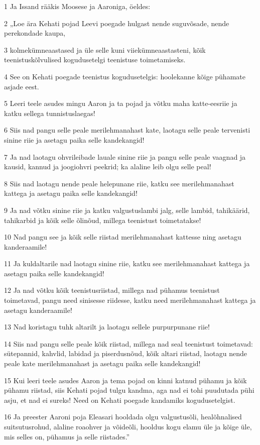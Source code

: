 \par 1 Ja Issand rääkis Moosese ja Aaroniga, öeldes:
\par 2 „Loe ära Kehati pojad Leevi poegade hulgast nende suguvõsade, nende perekondade kaupa,
\par 3 kolmekümneaastased ja üle selle kuni viiekümneaastasteni, kõik teenistuskõlvulised kogudusetelgi teenistuse toimetamiseks.
\par 4 See on Kehati poegade teenistus kogudusetelgis: hoolekanne kõige pühamate asjade eest.
\par 5 Leeri teele asudes mingu Aaron ja ta pojad ja võtku maha katte-eesriie ja katku sellega tunnistuslaegas!
\par 6 Siis nad pangu selle peale merilehmanahast kate, laotagu selle peale tervenisti sinine riie ja asetagu paika selle kandekangid!
\par 7 Ja nad laotagu ohvrileibade lauale sinine riie ja pangu selle peale vaagnad ja kausid, kannud ja joogiohvri peekrid; ka alaline leib olgu selle peal!
\par 8 Siis nad laotagu nende peale helepunane riie, katku see merilehmanahast kattega ja asetagu paika selle kandekangid!
\par 9 Ja nad võtku sinine riie ja katku valgustuslambi jalg, selle lambid, tahikäärid, tahikarbid ja kõik selle õlinõud, millega teenistust toimetatakse!
\par 10 Nad pangu see ja kõik selle riistad merilehmanahast kattesse ning asetagu kanderaamile!
\par 11 Ja kuldaltarile nad laotagu sinine riie, katku see merilehmanahast kattega ja asetagu paika selle kandekangid!
\par 12 Ja nad võtku kõik teenistusriistad, millega nad pühamus teenistust toimetavad, pangu need sinisesse riidesse, katku need merilehmanahast kattega ja asetagu kanderaamile!
\par 13 Nad koristagu tuhk altarilt ja laotagu sellele purpurpunane riie!
\par 14 Siis nad pangu selle peale kõik riistad, millega nad seal teenistust toimetavad: sütepannid, kahvlid, labidad ja piserdusnõud, kõik altari riistad, laotagu nende peale kate merilehmanahast ja asetagu paika selle kandekangid!
\par 15 Kui leeri teele asudes Aaron ja tema pojad on kinni katnud pühamu ja kõik pühamu riistad, siis Kehati pojad tulgu kandma, aga nad ei tohi puudutada pühi asju, et nad ei sureks! Need on Kehati poegade kandamiks kogudusetelgist.
\par 16 Ja preester Aaroni poja Eleasari hooldada olgu valgustusõli, healõhnalised suitsutusrohud, alaline roaohver ja võideõli, hooldus kogu elamu üle ja kõige üle, mis selles on, pühamus ja selle riistades.”
